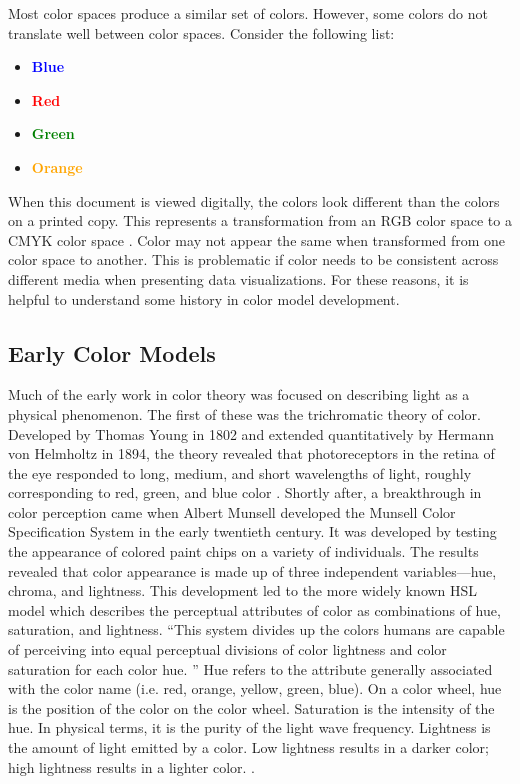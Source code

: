 \documentclass[journal,12pt]{IEEEtran}
\begin{document}
Most color spaces produce a similar set of colors. However, some colors
do not translate well between color spaces. Consider the following list:
\begin{itemize}
\item \textcolor{blue}{\textbf{Blue}}
\item \textcolor{red}{\textbf{Red}}
\item \textcolor{green}{\textbf{Green}}
\item \textcolor{orange}{\textbf{Orange}}
\end{itemize}
When this document is viewed digitally, the colors look
different than the colors on a printed copy. This represents
a transformation from an RGB color space to a CMYK color space \cite{colorvblackwhite}.
Color may not appear the same when transformed from one color space to another.
This is problematic if color needs to be consistent across
different media when presenting data visualizations.
For these reasons, it is helpful to understand some history in color model development.

\subsection{Early Color Models}

Much of the early work in color theory was focused on describing light as a physical phenomenon.
The first of these was the trichromatic theory of color. 
Developed by Thomas Young in 1802 and extended quantitatively by 
Hermann von Helmholtz in 1894, the theory revealed that photoreceptors
in the retina of the eye responded to long, medium, and short wavelengths of light, 
roughly corresponding to red, green, and blue color \cite{colorimetry}.
Shortly after, a breakthrough in color perception came when
Albert Munsell developed the Munsell Color Specification System in the early twentieth century.
It was developed by testing the appearance of colored paint chips on a variety of individuals.
The results revealed that color appearance is made up of
three independent variables---hue, chroma, and lightness.
This development led to the more
widely known HSL model which describes the perceptual attributes of color as combinations of hue,
saturation, and lightness\cite{colormapping,colorimetry}.
``This system
divides up the colors humans are capable of perceiving
into equal perceptual divisions of color lightness and
color saturation for each color hue. \cite{colormapping}''
Hue refers to the attribute generally associated with the color name (i.e. red,
orange, yellow, green, blue). On a color wheel, hue is the position of the color
on the color wheel. Saturation is the intensity of the hue. In
physical terms, it is the purity of the light wave frequency. Lightness is the
amount of light emitted by a color. Low lightness results in a darker color;
high lightness results in a lighter color. \cite{colorguidelines}.
\end{document}
